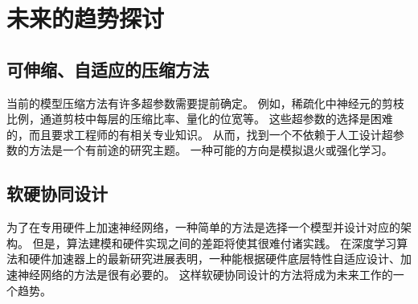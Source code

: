 \section{未来的趋势探讨}
\subsection{可伸缩、自适应的压缩方法}
当前的模型压缩方法有许多超参数需要提前确定。
例如，稀疏化中神经元的剪枝比例，通道剪枝中每层的压缩比率、量化的位宽等。
这些超参数的选择是困难的，而且要求工程师的有相关专业知识。
从而，找到一个不依赖于人工设计超参数的方法是一个有前途的研究主题。
一种可能的方向是模拟退火或强化学习。

\subsection{软硬协同设计}
为了在专用硬件上加速神经网络，一种简单的方法是选择一个模型并设计对应的架构。
但是，算法建模和硬件实现之间的差距将使其很难付诸实践。
在深度学习算法和硬件加速器上的最新研究进展表明，一种能根据硬件底层特性自适应设计、加速神经网络的方法是很有必要的。
这样软硬协同设计的方法将成为未来工作的一个趋势。
